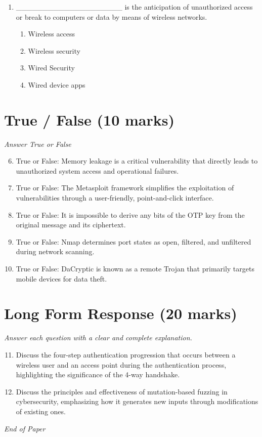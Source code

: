 \documentclass[12pt]{article}
\begin{document}
\begin{enumerate}[label=\arabic*.]
\begin{enumerate}[label=(\alph*)]
    \item Determine who the user is
\end{enumerate}
\item \_\_\_\_\_\_\_\_\_\_\_\_\_\_\_\_\_\_\_\_ is the anticipation of unauthorized access or break to computers or data by means of wireless networks.
\begin{enumerate}[label=(\alph*)]
    \item Wireless access
    \item Wireless security
    \item Wired Security
    \item Wired device apps
\end{enumerate}
\end{enumerate}

\section*{True / False (10 marks)}
\textit{Answer True or False}
\begin{enumerate}[label=\arabic*.]
\setcounter{enumi}{5}
\item True or False: Memory leakage is a critical vulnerability that directly leads to unauthorized system access and operational failures.
\item True or False: The Metasploit framework simplifies the exploitation of vulnerabilities through a user-friendly, point-and-click interface.
\item True or False: It is impossible to derive any bits of the OTP key from the original message and its ciphertext.
\item True or False: Nmap determines port states as open, filtered, and unfiltered during network scanning.
\item True or False: DaCryptic is known as a remote Trojan that primarily targets mobile devices for data theft.
\end{enumerate}

\section*{Long Form Response (20 marks)}
\textit{Answer each question with a clear and complete explanation.}
\begin{enumerate}[label=\arabic*.]
\setcounter{enumi}{10}
\item Discuss the four-step authentication progression that occurs between a wireless user and an access point during the authentication process, highlighting the significance of the 4-way handshake.
\item Discuss the principles and effectiveness of mutation-based fuzzing in cybersecurity, emphasizing how it generates new inputs through modifications of existing ones.
\end{enumerate}

\vfill
\noindent\textit{End of Paper}
\end{document}
